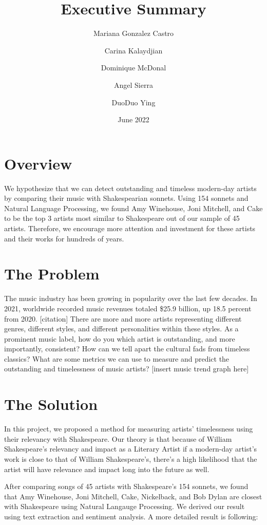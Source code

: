 \documentclass[11pt,a4paper]{article}
\title{Executive Summary}
\author[*]{Mariana Gonzalez Castro}
\author[*]{Carina Kalaydjian}
\author[*]{Dominique McDonal}
\author[*]{Angel Sierra}
\author[*]{DuoDuo Ying}
\affil[*]{Department of Statistics, UCLA}
\date{June 2022}
\begin{document}
\maketitle

\section{Overview}

We hypothesize that we can detect outstanding and timeless modern-day artists by comparing their music with Shakespearian sonnets. Using 154 sonnets and Natural Language Processing, we found Amy Winehouse, Joni Mitchell, and Cake to be the top 3 artists most similar to Shakespeare out of our sample of 45 artists. Therefore, we encourage more attention and investment for these artists and their works for hundreds of years.

\section{The Problem}

The music industry has been growing in popularity over the last few decades. In 2021, worldwide recorded music revenues totaled \$25.9 billion, up 18.5 percent from 2020. [citation] There are more and more artists representing different genres, different styles, and different personalities within these styles. As a prominent music label, how do you which artist is outstanding, and more importantly, consistent? How can we tell apart the cultural fads from timeless classics? What are some metrics we can use to measure and predict the outstanding and timelessness of music artists? [insert music trend graph here]

\section{The Solution}

In this project, we proposed a method for measuring artists’ timelessness using their relevancy with Shakespeare. Our theory is that because of William Shakespeare’s relevancy and impact as a Literary Artist if a modern-day artist’s work is close to that of William Shakespeare’s, there’s a high likelihood that the artist will have relevance and impact long into the future as well.

After comparing songs of 45 artists with Shakespeare's 154 sonnets, we found that Amy Winehouse, Joni Mitchell, Cake, Nickelback, and Bob Dylan are closest with Shakespeare using Natural Langauge Processing. We derived our result using text extraction and sentiment analysis. A more detailed result is following:
\end{document}
